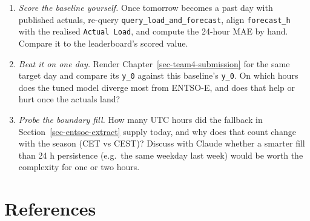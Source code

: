 \documentclass[
  english,
  letterpaper,
]{scrbook}
\providecommand{\tightlist}{%
  \setlength{\itemsep}{0pt}\setlength{\parskip}{0pt}}
\begin{document}
\begin{tcolorbox}[enhanced jigsaw, arc=.35mm, bottomrule=.15mm, bottomtitle=1mm, breakable, colback=white, colbacktitle=quarto-callout-tip-color!10!white, colframe=quarto-callout-tip-color-frame, coltitle=black, left=2mm, leftrule=.75mm, opacityback=0, opacitybacktitle=0.6, rightrule=.15mm, title=\textcolor{quarto-callout-tip-color}{\faLightbulb}\hspace{0.5em}{Exercises (with Claude)}, titlerule=0mm, toprule=.15mm, toptitle=1mm]

\begin{enumerate}
\def\labelenumi{\arabic{enumi}.}
\tightlist
\item
  \emph{Score the baseline yourself.} Once tomorrow becomes a past day
  with published actuals, re-query \texttt{query\_load\_and\_forecast},
  align \texttt{forecast\_h} with the realised \texttt{Actual\ Load},
  and compute the 24-hour MAE by hand. Compare it to the leaderboard's
  scored value.
\item
  \emph{Beat it on one day.} Render Chapter~\ref{sec-team4-submission}
  for the same target day and compare its \texttt{y\_0} against this
  baseline's \texttt{y\_0}. On which hours does the tuned model diverge
  most from ENTSO-E, and does that help or hurt once the actuals land?
\item
  \emph{Probe the boundary fill.} How many UTC hours did the fallback in
  Section~\ref{sec-entsoe-extract} supply today, and why does that count
  change with the season (CET vs CEST)? Discuss with Claude whether a
  smarter fill than 24 h persistence (e.g.~the same weekday last week)
  would be worth the complexity for one or two hours.
\end{enumerate}

\end{tcolorbox}


\chapter*{References}\label{references}

\end{document}
